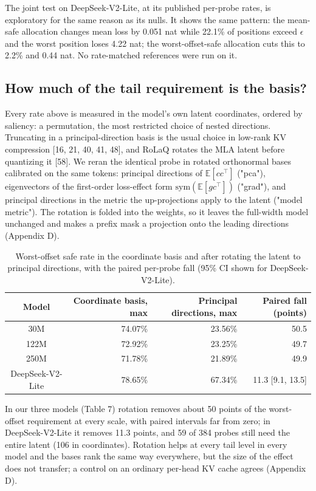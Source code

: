 \documentclass[10pt]{article}
\begin{document}
The joint test on DeepSeek-V2-Lite, at its published per-probe rates, is exploratory for the same reason as its nulls. It shows the same pattern: the mean-safe allocation changes mean loss by 0.051 nat while 22.1\% of positions exceed $\epsilon$ and the worst position loses 4.22 nat; the worst-offset-safe allocation cuts this to 2.2\% and 0.44 nat. No rate-matched references were run on it.

\subsection{How much of the tail requirement is the basis?}

Every rate above is measured in the model's own latent coordinates, ordered by saliency: a permutation, the most restricted choice of nested directions. Truncating in a principal-direction basis is the usual choice in low-rank KV compression [16, 21, 40, 41, 48], and RoLaQ rotates the MLA latent before quantizing it [58]. We reran the identical probe in rotated orthonormal bases calibrated on the same tokens: principal directions of $\mathbb E[cc^\top]$ ("pca"), eigenvectors of the first-order loss-effect form $\mathrm{sym}(\mathbb E[gc^\top])$ ("grad"), and principal directions in the metric the up-projections apply to the latent ("model metric"). The rotation is folded into the weights, so it leaves the full-width model unchanged and makes a prefix mask a projection onto the leading directions (Appendix D).

\begin{table}[t]
\centering
\caption{Worst-offset safe rate in the coordinate basis and after rotating the latent to principal directions, with the paired per-probe fall (95\% CI shown for DeepSeek-V2-Lite).}
\small
\begin{tabular}{crrr}
\toprule
Model & Coordinate basis, max & Principal directions, max & Paired fall (points) \\
\midrule
30M & 74.07\% & 23.56\% & 50.5 \\
122M & 72.92\% & 23.25\% & 49.7 \\
250M & 71.78\% & 21.89\% & 49.9 \\
DeepSeek-V2-Lite & 78.65\% & 67.34\% & 11.3 [9.1, 13.5] \\
\bottomrule
\end{tabular}
\end{table}

In our three models (Table 7) rotation removes about 50 points of the worst-offset requirement at every scale, with paired intervals far from zero; in DeepSeek-V2-Lite it removes 11.3 points, and 59 of 384 probes still need the entire latent (106 in coordinates). Rotation helps at every tail level in every model and the bases rank the same way everywhere, but the size of the effect does not transfer; a control on an ordinary per-head KV cache agrees (Appendix D).
\end{document}
